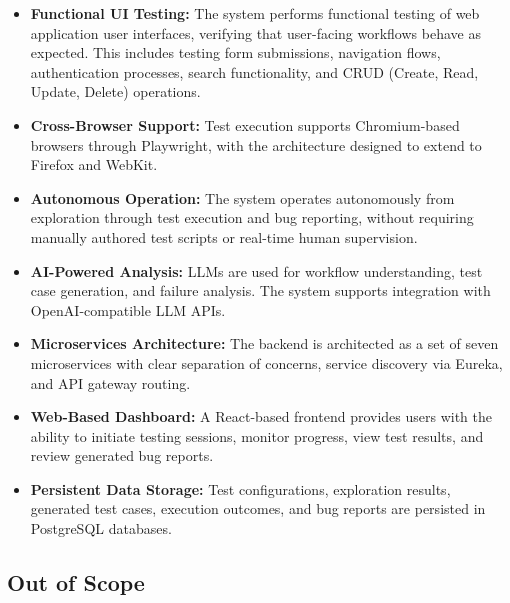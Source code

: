 \begin{itemize}
    \item \textbf{Functional UI Testing:} The system performs functional testing of web application user interfaces, verifying that user-facing workflows behave as expected. This includes testing form submissions, navigation flows, authentication processes, search functionality, and CRUD (Create, Read, Update, Delete) operations.

    \item \textbf{Cross-Browser Support:} Test execution supports Chromium-based browsers through Playwright, with the architecture designed to extend to Firefox and WebKit.

    \item \textbf{Autonomous Operation:} The system operates autonomously from exploration through test execution and bug reporting, without requiring manually authored test scripts or real-time human supervision.

    \item \textbf{AI-Powered Analysis:} LLMs are used for workflow understanding, test case generation, and failure analysis. The system supports integration with OpenAI-compatible LLM APIs.

    \item \textbf{Microservices Architecture:} The backend is architected as a set of seven microservices with clear separation of concerns, service discovery via Eureka, and API gateway routing.

    \item \textbf{Web-Based Dashboard:} A React-based frontend provides users with the ability to initiate testing sessions, monitor progress, view test results, and review generated bug reports.

    \item \textbf{Persistent Data Storage:} Test configurations, exploration results, generated test cases, execution outcomes, and bug reports are persisted in PostgreSQL databases.
\end{itemize}

\subsection{Out of Scope}
\label{subsec:out_of_scope}

